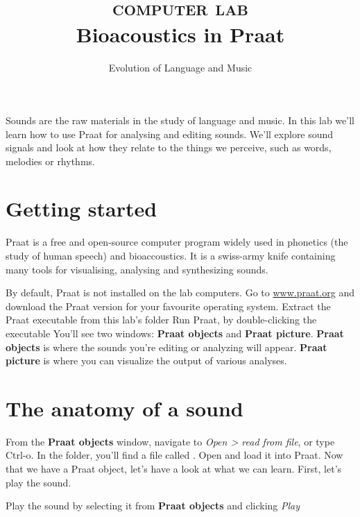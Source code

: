 \documentclass[a4paper, 9pt]{article}
\title{\textsc{computer lab}\\ \textbf{Bioacoustics in Praat}}
\author{Evolution of Language and Music}
\date{}
\begin{document}
\maketitle
{}

\begin{goals}
Sounds are the raw materials in the study of language and music. In this
lab we'll learn how to use Praat for analysing and editing sounds. We'll
explore sound signals and look at how they relate to the things we
perceive, such as words, melodies or rhythms.
\end{goals}

\section{Getting started}\label{getting-started}

Praat is a free and open-source computer program widely used in
phonetics (the study of human speech) and bioaccoustics. It is a
swiss-army knife containing many tools for visualising, analysing and
synthesizing sounds.

\begin{exercise}
  \action By default, Praat is not installed on the lab computers. Go to 
  \url{www.praat.org} and download the Praat version for your favourite 
  operating system.
  \action Extract the Praat executable from this lab's folder
  \action Run Praat, by double-clicking the executable
  \action You'll see two windows: \textbf{Praat objects} and \textbf{Praat
  picture}. \textbf{Praat objects} is where the sounds you're editing or
  analyzing will appear. \textbf{Praat picture} is where you can visualize
  the output of various analyses.
\end{exercise}


\section{The anatomy of a sound}\label{the-anatomy-of-a-sound}

From the \textbf{Praat objects} window, navigate to \emph{Open
> read from file}, or type Ctrl-o. In the 
folder, you'll find a file called . Open and load it into
Praat. Now that we have a Praat object, let's have a look at what we can
learn. First, let's play the sound.

\begin{exercise}
\action Play the sound by selecting it from \textbf{Praat objects} and clicking \textit{Play}
\end{exercise}
\end{document}
